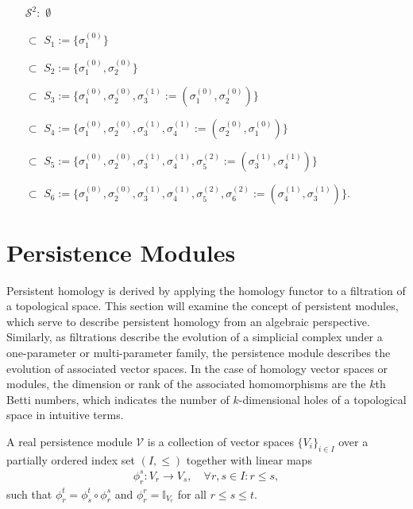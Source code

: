 \begin{example}{\cite[\S 2.2, Example]{de2011dualities}}
	\begin{itemize}
		\item[$\mathcal{S}^{2}:$] $\emptyset$
		\item[$\subset$] $S_{1} := \{\sigma_{1}^{(0)}\}$
		\item[$\subset$] $S_{2} := \{\sigma_{1}^{(0)}, \sigma_{2}^{(0)}\}$
		\item[$\subset$] $S_{3} := \{\sigma_{1}^{(0)}, \sigma_{2}^{(0)}, \sigma_{3}^{(1)} := (\sigma_{1}^{(0)}, \sigma_{2}^{(0)})\}$
		\item[$\subset$] $S_{4} := \{\sigma_{1}^{(0)}, \sigma_{2}^{(0)}, \sigma_{3}^{(1)}, \sigma_{4}^{(1)} := (\sigma_{2}^{(0)}, \sigma_{1}^{(0)})\}$
		\item[$\subset$] $S_{5} := \{\sigma_{1}^{(0)}, \sigma_{2}^{(0)}, \sigma_{3}^{(1)}, \sigma_{4}^{(1)}, \sigma_{5}^{(2)} := (\sigma_{3}^{(1)}, \sigma_{4}^{(1)})\}$
		\item[$\subset$] $S_{6} := \{\sigma_{1}^{(0)}, \sigma_{2}^{(0)}, \sigma_{3}^{(1)}, \sigma_{4}^{(1)}, \sigma_{5}^{(2)}, \sigma_{6}^{(2)} := (\sigma_{4}^{(1)}, \sigma_{3}^{(1)})\}.$
	\end{itemize}
\end{example}
\vspace{0.2cm}

\section{Persistence Modules}
\label{PersistenceModules}
Persistent homology is derived by applying the homology functor to a filtration of a topological space. This section will examine the concept of persistent modules, which serve to describe persistent homology from an algebraic perspective. Similarly, as filtrations describe the evolution of a simplicial complex under a one-parameter or multi-parameter family, the persistence module describes the evolution of associated vector spaces. In the case of homology vector spaces or modules, the dimension or rank of the associated homomorphisms are the $k$th Betti numbers, which indicates the number of $k$-dimensional holes of a topological space in intuitive terms.

\begin{definition}{\cite[\S 1.1]{chazal2016structure}}
A real persistence module $\mathcal{V}$ is a collection of vector spaces $\{V_i\}_{i \in I}$ over a partially ordered index set $(I,\leq)$ together with linear maps
\begin{align}
\phi_{r}^{s}: V_r \rightarrow V_s, \quad \forall r,s \in I: r \leq s,
\end{align}
such that $\phi_{r}^{t} = \phi^{t}_{s} \circ \phi_{r}^{s}$ and $\phi_{r}^r = \mathbb{I}_{V_r}$ for all $r \leq s \leq t$.
\end{definition}

